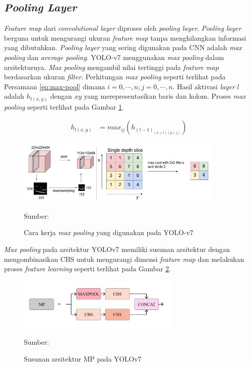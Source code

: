    \subsection{\textit{Pooling Layer}}
    \textit{Feature map} dari \textit{convolutional layer} diproses oleh \textit{pooling layer}. \textit{Pooling layer} berguna untuk mengurangi ukuran \textit{feature map} tanpa menghilangkan informasi yang dibutuhkan. \textit{Pooling layer} yang sering digunakan pada CNN adalah \textit{max pooling} dan \textit{average pooling}. YOLO-v7 menggunakan \textit{max pooling} dalam arsitekturnya. \textit{Max pooling} mengambil nilai tertinggi pada \textit{feature map} berdasarkan ukuran \textit{filter}. Perhitungan \textit{max pooling} seperti terlihat pada Persamaan \ref{eq:max-pool} dimana $i=0, \cdots, n;j=0, \cdots, n$. Hasil aktivasi \textit{layer} $l$ adalah $h_{l(x,y)}$ dengan $xy$ yang merepresentasikan baris dan kolom. Proses \textit{max pooling} seperti terlihat pada Gambar \ref{fig:max-pool}.

    \begin{align}
        \label{eq:max-pool}
        h_{l(x,y)} &= max_{ij}(h_{(l-1)_{(x+i)(y+j)}})
    \end{align}

    \begin{figure}[H]
        \centering
        \includegraphics[width=10cm]{img/bab2/maxpool.png}
        \caption{Cara kerja \textit{max pooling} yang digunakan pada YOLO-v7}
        \label{fig:max-pool}
        Sumber: \citep{Yani2019}
    \end{figure}

    \textit{Max pooling} pada arsitektur YOLOv7 memiliki susunan arsitektur dengan mengombinasikan CBS untuk mengurangi dimensi \textit{feature map} dan melakukan proses \textit{feature learning} seperti terlihat pada Gambar \ref{fig:mp}.

    \begin{figure}[H]
        \begin{center}
            \includegraphics[width=8cm]{img/bab2/mp.png}
            \caption{Susunan arsitektur MP pada YOLOv7}
            \label{fig:mp}
            Sumber: \citep{Wang2022}
        \end{center}
    \end{figure}

